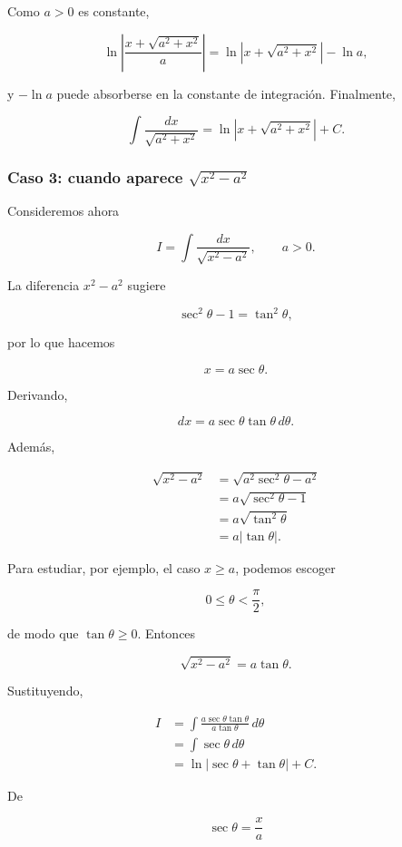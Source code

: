 Como $a>0$ es constante,

\[
\ln\left|\frac{x+\sqrt{a^2+x^2}}{a}\right|
=\ln|x+\sqrt{a^2+x^2}|-\ln a,
\]

y $-\ln a$ puede absorberse en la constante de integración. Finalmente,

\[
\boxed{
\int\frac{dx}{\sqrt{a^2+x^2}}
=\ln|x+\sqrt{a^2+x^2}|+C.}
\]

\subsubsection*{Caso 3: cuando aparece \(\sqrt{x^2-a^2}\)}

Consideremos ahora

\[
I=\int\frac{dx}{\sqrt{x^2-a^2}},\qquad a>0.
\]

La diferencia $x^2-a^2$ sugiere

\[
\sec^2\theta-1=\tan^2\theta,
\]

por lo que hacemos

\[
\boxed{x=a\sec\theta}.
\]

Derivando,

\[
dx=a\sec\theta\tan\theta\,d\theta.
\]

Además,

\begin{align*}
\sqrt{x^2-a^2}
&=\sqrt{a^2\sec^2\theta-a^2}\\
&=a\sqrt{\sec^2\theta-1}\\
&=a\sqrt{\tan^2\theta}\\
&=a|\tan\theta|.
\end{align*}

Para estudiar, por ejemplo, el caso $x\ge a$, podemos escoger

\[
0\leq\theta<\frac{\pi}{2},
\]

de modo que $\tan\theta\ge0$. Entonces

\[
\sqrt{x^2-a^2}=a\tan\theta.
\]

Sustituyendo,

\begin{align*}
I
&=\int
\frac{a\sec\theta\tan\theta}
     {a\tan\theta}\,d\theta\\
&=\int\sec\theta\,d\theta\\
&=\ln|\sec\theta+\tan\theta|+C.
\end{align*}

De

\[
\sec\theta=\frac{x}{a}
\]

